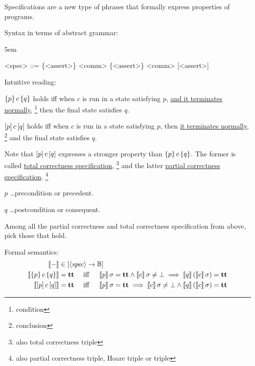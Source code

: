 \begin{enumcirc}
	\item
	Specifications are a new type of phrases that formally express properties of
	programs.
	\item
	Syntax in terms of abstract grammar:
	\begin{center}
		\begin{minipage}{0.5\textwidth}
			\grammarindent5em
			\begin{grammar}
				<spec> ::= \{<assert>\} <comm> \{<assert>\}
				\alt [<assert>] <comm> [<assert>]
			\end{grammar}
		\end{minipage}
	\end{center}
	\begin{exampletab}
		\todo
	\end{exampletab}
	\item
	Intuitive reading:
	\begin{enumrm}
		\item
		$\left\{ p \right\} c \left\{ q \right\}$ holds iff when $c$ is run in a state satisfying $p$,
		\ul{and it terminates normally}, \footnote{condition} then the final state satisfies $q$.
		\item
		$\left[ p \right] c \left[ q \right]$ holds iff when $c$ is run in a state satisfying $p$,
		then \ul{it terminates normally}, \footnote{conclusion} and the final state satisfies $q$.
	\end{enumrm}
	Note that $\left[ p \right] c \left[ q \right]$ expresses a stronger property than
	$\left\{ p \right\} c \left\{ q \right\}$.
	The former is called \ul{total correctness specification}, \footnote{also total
		correctness triple} and the latter \ul{partial correctness specification}.
	\footnote{also partial correctness triple, Hoare triple or triple}

	$p$ \dots precondition or precedent.

	$q$ \dots postcondition or consequent.

	\begin{exercise}
		Among all the partial correctness and total correctness specification from
		above, pick those that hold.
	\end{exercise}
	\item
	Formal semantics:
	\begin{align*}
		\left\llbracket - \right\rrbracket                           & \in \left[ \left\langle \textit{spec} \right\rangle \to \mathbb{B} \right] \\
		\left\llbracket \left\{ p \right\} c \left\{ q \right\} \right\rrbracket     & = \textbf{tt} \quad \textrm{ iff } \quad
		\left\llbracket p \right\rrbracket \sigma = \textbf{tt} \wedge \left\llbracket c \right\rrbracket \sigma \neq \bot \implies
		\left\llbracket q \right\rrbracket \left( \left\llbracket c \right\rrbracket \sigma \right) = \textbf{tt}                           \\
		\left\llbracket \left[ p \right] c \left[ q \right] \right\rrbracket & = \textbf{tt} \quad \textrm{ iff } \quad
		\left\llbracket p \right\rrbracket \sigma = \textbf{tt} \implies \left\llbracket c \right\rrbracket \sigma \neq \bot \wedge
		\left\llbracket q \right\rrbracket \left( \left\llbracket c \right\rrbracket \sigma \right) = \textbf{tt}
	\end{align*}

\end{enumcirc}

